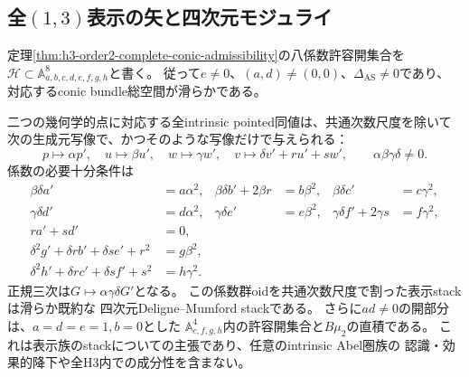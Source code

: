 \subsection{全$(1,3)$表示の矢と四次元モジュライ}
\label{subsec:h3-order2-full-moduli}
定理\ref{thm:h3-order2-complete-conic-admissibility}の八係数許容開集合を
$\mathcal H\subset\mathbb A^8_{a,b,c,d,e,f,g,h}$と書く。
従って$e\ne0$、$(a,d)\ne(0,0)$、$\Delta_{\mathrm{AS}}\ne0$であり、
対応するconic bundle総空間が滑らかである。

\begin{theorem}\label{thm:h3-order2-full-arrows}
二つの幾何学的点に対応する全intrinsic pointed同値は、共通次数尺度を除いて
次の生成元写像で、かつそのような写像だけで与えられる：
\[
 p\mapsto\alpha p',\quad u\mapsto\beta u',\quad
 w\mapsto\gamma w',\quad v\mapsto\delta v'+r u'+s w',
 \qquad\alpha\beta\gamma\delta\ne0.
\]
係数の必要十分条件は
\begin{align*}
 \beta\delta a'&=a\alpha^2,&
 \beta\delta b'+2\beta r&=b\beta^2,&
 \beta\delta c'&=c\gamma^2,\\
 \gamma\delta d'&=d\alpha^2,&
 \gamma\delta e'&=e\beta^2,&
 \gamma\delta f'+2\gamma s&=f\gamma^2,\\
 ra'+sd'&=0,&&&\\
 \delta^2g'+\delta r b'+\delta s e'+r^2&=g\beta^2,&&&\\
 \delta^2h'+\delta r c'+\delta s f'+s^2&=h\gamma^2.&&&
\end{align*}
正規三次は$G\mapsto\alpha\gamma\delta G'$となる。
この係数群oidを共通次数尺度で割った表示stackは滑らか既約な
四次元Deligne--Mumford stackである。
さらに$ad\ne0$の開部分は、$a=d=e=1,b=0$とした
$\mathbb A^4_{c,f,g,h}$内の許容開集合と$B\mu_2$の直積である。
これは表示族のstackについての主張であり、任意のintrinsic Abel圏族の
認識・効果的降下や全H3内での成分性を含まない。
\end{theorem}
